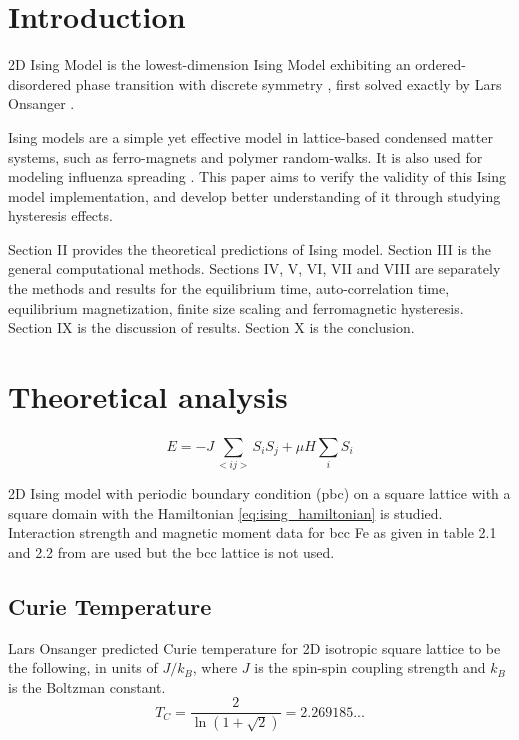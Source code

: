\documentclass[%
showkeys,
bibnotes,
amsmath,amssymb,
floatfix,
]{revtex4-1}
\begin{document}

\section{\label{sec:intro}Introduction}
2D Ising Model is the lowest-dimension Ising Model exhibiting an ordered-disordered phase transition with discrete symmetry \cite{PhysRevLett.17.1133}, first solved exactly by Lars Onsanger \cite{PhysRev.65.117}.

Ising models are a simple yet effective model in lattice-based condensed matter systems, such as ferro-magnets and polymer random-walks. It is also used for modeling influenza spreading \cite{10.1371/journal.pone.0063935}. This paper aims to verify the validity of this Ising model implementation, and develop better understanding of it through studying hysteresis effects.

Section II provides the theoretical predictions of Ising model. Section III is the general computational methods. Sections IV, V, VI, VII and VIII are separately the methods and results for the equilibrium time, auto-correlation time, equilibrium magnetization, finite size scaling and ferromagnetic hysteresis. Section IX is the discussion of results. Section X is the conclusion.

\section{\label{sec:theory}Theoretical analysis}
\begin{equation}
E = -J \sum_{<ij>}^{}S_{i}S_{j} + \mu H \sum_{i}^{}S_{i} \label{eq:ising_hamiltonian}
\end{equation}

2D Ising model with periodic boundary condition (pbc) on a square lattice with a square domain with the Hamiltonian \ref{eq:ising_hamiltonian} is studied. Interaction strength and magnetic moment data for bcc Fe as given in table 2.1 and 2.2 from \cite{soton45942} are used but the bcc lattice is not used.
\subsection{\label{sec:theory:curie}Curie Temperature}

Lars Onsanger \cite{PhysRev.65.117} predicted Curie temperature for 2D isotropic square lattice to be the following, in units of $J/k_B$, where $J$ is the spin-spin coupling strength and $k_B$ is the Boltzman constant.
\begin{equation}
T_{C} = \frac{2}{\ln(1+\sqrt{2})}=2.269185...
\label{eq:curie_temp}
\end{equation}
\end{document}
